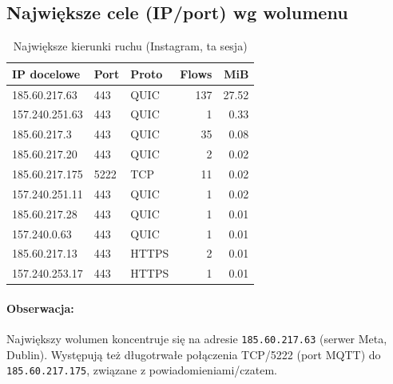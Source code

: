 \subsection{Największe cele (IP/port) wg wolumenu}
\begin{table}[H]
  \centering
  \caption{Największe kierunki ruchu (Instagram, ta sesja)}
  \label{tab:ig-topdst}
  \begin{tabular}{lllrr}
    \toprule
    \textbf{IP docelowe} & \textbf{Port} & \textbf{Proto} & \textbf{Flows} & \textbf{MiB} \\
    \midrule
    185.60.217.63   & 443 & QUIC  & 137 & 27.52 \\
    157.240.251.63  & 443 & QUIC  & 1   & 0.33 \\
    185.60.217.3    & 443 & QUIC  & 35  & 0.08 \\
    185.60.217.20   & 443 & QUIC  & 2   & 0.02 \\
    185.60.217.175  & 5222 & TCP  & 11  & 0.02 \\
    157.240.251.11  & 443 & QUIC  & 1   & 0.02 \\
    185.60.217.28   & 443 & QUIC  & 1   & 0.01 \\
    157.240.0.63    & 443 & QUIC  & 1   & 0.01 \\
    185.60.217.13   & 443 & HTTPS & 2   & 0.01 \\
    157.240.253.17  & 443 & HTTPS & 1   & 0.01 \\
    \bottomrule
  \end{tabular}
\end{table}

\paragraph{Obserwacja:}
Największy wolumen koncentruje się na adresie \texttt{185.60.217.63} (serwer Meta, Dublin). Występują też długotrwałe połączenia TCP/5222 (port MQTT) do \texttt{185.60.217.175}, związane z powiadomieniami/czatem.

